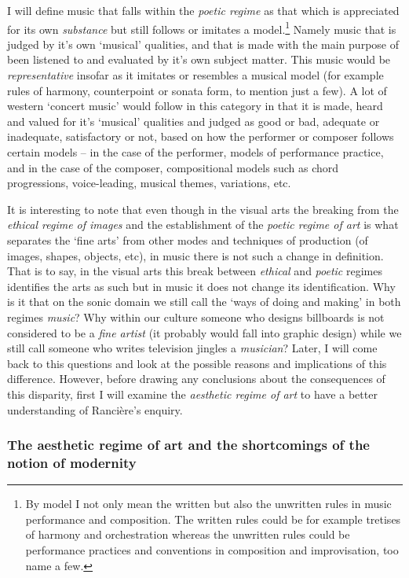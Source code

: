 I will define music that falls within the \emph{poetic regime} as that which is appreciated for its own \emph{substance} but still follows or imitates a model.\footnote{By model I not only mean the written but also the unwritten rules in music performance and composition. The written rules could be for example tretises of harmony and orchestration whereas the unwritten rules could be performance practices and conventions in composition and improvisation, too name a few.} Namely music that is judged by it's own `musical' qualities, and that is made with the main purpose of been listened to and evaluated by it's own subject matter. This music would be \emph{representative} insofar as it imitates or resembles a musical model (for example rules of harmony, counterpoint or sonata form, to mention just a few). A lot of western `concert music' would follow in this category in that it is made, heard and valued for it's `musical' qualities and judged as good or bad, adequate or inadequate, satisfactory or not, based on how the performer or composer follows certain models -- in the case of the performer, models of performance practice, and in the case of the composer, compositional models such as chord progressions, voice-leading, musical themes, variations, etc. 

It is interesting to note that even though in the visual arts the breaking from the \emph{ethical regime of images} and the establishment of the \emph{poetic regime of art} is what separates the `fine arts' from other modes and techniques of production (of images, shapes, objects, etc), in music there is not such a change in definition. That is to say, in the visual arts this break between \emph{ethical} and \emph{poetic} regimes identifies the arts as such but in music it does not change its identification. Why is it that on the sonic domain we still call the `ways of doing and making' in both regimes \emph{music}? Why within our culture someone who designs billboards is not considered to be a \emph{fine artist} (it probably would fall into graphic design) while we still call someone who writes television jingles a \emph{musician}? Later, I will come back to this questions and look at the possible reasons and implications of this difference. However, before drawing any conclusions about the consequences of this disparity, first I will examine the \emph{aesthetic regime of art} to have a better understanding of Ranci\`{e}re's enquiry.

\subsubsection{The aesthetic regime of art and the shortcomings of the notion of modernity}

